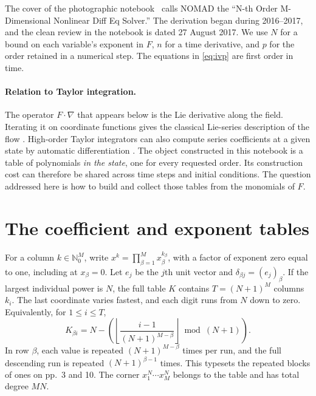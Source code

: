\documentclass[11pt,letterpaper]{article}
\newcommand{\NN}{\mathbb{N}_0}
\newcommand{\src}[1]{\par\smallskip\noindent{\small\itshape Notebook, #1.}\par\medskip}
\begin{document}
The cover of the photographic notebook~\cite{notebook} calls NOMAD the “N-th Order M-Dimensional Nonlinear Diff Eq Solver.”
The derivation began during 2016--2017, and the clean review in the notebook is
dated 27 August 2017. We use \(N\) for a bound on each variable's exponent in
\(F\), \(n\) for a time derivative, and \(p\) for the order retained in a
numerical step. The equations in \eqref{eq:ivp} are first order in time.

\paragraph{Relation to Taylor integration.}
The operator \(F\cdot\nabla\) that appears below is the Lie derivative along
the field. Iterating it on coordinate functions gives the classical Lie-series
description of the flow \cite{pal}. High-order Taylor integrators can also
compute series coefficients at a given state by automatic differentiation
\cite{jorba}. The object constructed in this notebook is a table of
polynomials \emph{in the state}, one for every requested order. Its
construction cost can therefore be shared across time steps and initial
conditions. The question addressed here is how to build and collect those
tables from the monomials of \(F\).
\src{pp.~2--11}

\section{The coefficient and exponent tables}\label{sec:encoding}
For a column \(k\in\NN^M\), write
\(x^k=\prod_{\beta=1}^M x_\beta^{k_\beta}\), with a factor of exponent zero
equal to one, including at \(x_\beta=0\). Let \(e_j\) be the \(j\)th unit
vector and \(\delta_{\beta j}=(e_j)_\beta\). If the largest individual power
is \(N\), the full table \(K\) contains \(T=(N+1)^M\) columns \(k_i\).
The last coordinate varies fastest, and each digit runs from \(N\) down to
zero. Equivalently, for \(1\leq i\leq T\),
\begin{equation}\label{eq:digit}
  K_{\beta i}=N-
  \left(\left\lfloor\frac{i-1}{(N+1)^{M-\beta}}\right\rfloor
        \bmod (N+1)\right).
\end{equation}
In row \(\beta\), each value is repeated \((N+1)^{M-\beta}\) times per
run, and the full descending run is repeated \((N+1)^{\beta-1}\) times.
This typesets the repeated blocks of ones on pp.~3 and 10. The corner
\(x_1^N\cdots x_M^N\) belongs to the table and has total degree \(MN\).
\end{document}
